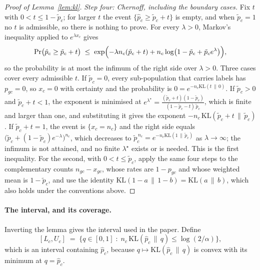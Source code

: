 \begin{proof}[Proof of Lemma~\ref{lem:kl}]
\emph{Step four: Chernoff, including the boundary cases.} Fix $t$ with
$0 < t \le 1 - \tilde p_c$; for larger $t$ the event $\{\hat p_c \ge \tilde p_c + t\}$ is empty, and
when $\tilde p_c = 1$ no $t$ is admissible, so there is nothing to prove. For
every $\lambda > 0$, Markov's inequality applied to $e^{\lambda x_c}$ gives
\[
\Pr\bigl(\hat p_c \ge \tilde p_c + t\bigr)
\;\le\; \exp\Bigl( -\lambda n_c (\tilde p_c + t) + n_c \log\bigl(1 - \tilde p_c + \tilde p_c e^{\lambda}\bigr) \Bigr) ,
\]
so the probability is at most the infimum of the right side over $\lambda > 0$. Three cases
cover every admissible $t$. If $\tilde p_c = 0$, every sub-population that carries labels has
$p_{gc} = 0$, so $x_c = 0$ with certainty and the probability is
$0 = e^{-n_c \mathrm{KL}(t \,\|\, 0)}$. If $\tilde p_c > 0$ and $\tilde p_c + t < 1$, the exponent is
minimised at
$e^{\lambda^{\star}} = \frac{(\tilde p_c + t)(1 - \tilde p_c)}{(1 - \tilde p_c - t)\,\tilde p_c}$,
which is finite and larger than one, and substituting it gives the exponent
$-n_c\,\mathrm{KL}(\tilde p_c + t \,\|\, \tilde p_c)$. If $\tilde p_c + t = 1$, the event is
$\{x_c = n_c\}$ and the right side equals $\bigl(\tilde p_c + (1 - \tilde p_c)e^{-\lambda}\bigr)^{n_c}$,
which decreases to $\tilde p_c^{\,n_c} = e^{-n_c \mathrm{KL}(1 \,\|\, \tilde p_c)}$ as
$\lambda \to \infty$; the infimum is not attained, and no finite $\lambda^{\star}$ exists or is
needed. This is the first inequality. For the
second, with $0 < t \le \tilde p_c$, apply the same four steps to the complementary counts
$n_{gc} - x_{gc}$, whose rates are $1 - p_{gc}$ and whose weighted mean is $1 - \tilde p_c$, and use
the identity $\mathrm{KL}(1-a \,\|\, 1-b) = \mathrm{KL}(a \,\|\, b)$, which also holds under the
conventions above.
\end{proof}

\paragraph{The interval, and its coverage.}
Inverting the lemma gives the interval used in the paper. Define
\[
[L_c, U_c] \;=\; \bigl\{ q \in [0,1] \;:\; n_c\,\mathrm{KL}(\hat p_c \,\|\, q) \le \log(2/\alpha) \bigr\} ,
\]
which is an interval containing $\hat p_c$, because $q \mapsto \mathrm{KL}(\hat p_c \,\|\, q)$
is convex with its minimum at $q = \hat p_c$.

